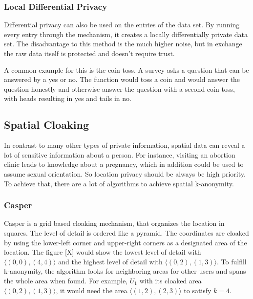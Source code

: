 \subsubsection{Local Differential Privacy}
Differential privacy can also be used on the entries of the data set. By running every entry through the mechanism, it creates a locally differentially private data set. The disadvantage to this method is the much higher noise, but in exchange the raw data itself is protected and doesn't require trust.

A common example for this is the coin toss. A survey asks a question that can be answered by a yes or no. The function would toss a coin and would answer the question honestly and otherwise answer the question with a second coin toss, with heads resulting in yes and tails in no. 

\subsection{Spatial Cloaking}
In contrast to many other types of private information, spatial data can reveal a lot of sensitive information about a person. For instance, visiting an abortion clinic leads to knowledge about a pregnancy, which in addition could be used to assume sexual orientation. So location privacy should be always be high priority. To achieve that, there are a lot of algorithms to achieve spatial k-anonymity.

\subsubsection{Casper}
Casper
is a grid based cloaking mechanism, that organizes the location in squares. The level of detail is ordered like a pyramid. The coordinates are cloaked by using the lower-left corner and upper-right corners as a designated area of the location. The figure [X] would show the lowest level of detail with \(\langle(0,0),(4,4)\rangle\) and the highest level of detail with \(\langle(0,2),(1,3)\rangle\). To fulfill k-anonymity, the algorithm looks for neighboring areas for other users and spans the whole area when found. For example, \(U_1\) with its cloaked area \(\langle(0,2),(1,3)\rangle\), it would need the area \(\langle(1,2),(2,3)\rangle\) to satisfy \(k=4\).


